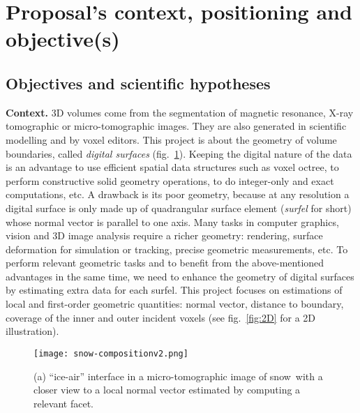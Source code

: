 \section{Proposal's context, positioning and objective(s)}
\label{sec:context}

\subsection{Objectives and scientific hypotheses}


\noindent\textbf{Context.}
3D volumes come from the segmentation of magnetic resonance, X-ray tomographic or micro-tomographic images. 
They are also generated in scientific modelling and by voxel editors. 
This project is about the geometry of volume boundaries, called \emph{digital surfaces} (fig.~\ref{fig:snow}). 
Keeping the digital nature of the data is an advantage
to use efficient spatial data structures such as voxel octree, 
to perform constructive solid geometry operations,
to do integer-only and exact computations, etc.
A drawback is its poor geometry, because at any resolution a digital surface is only 
made up of quadrangular surface element (\emph{surfel} for short) 
whose normal vector is parallel to one axis. 
Many tasks in computer graphics, vision and 3D image analysis require a richer geometry: 
rendering, surface deformation for simulation or tracking, precise geometric measurements, etc.
To perform relevant geometric tasks and 
to benefit from the above-mentioned advantages in the same time, 
we need to enhance the geometry of digital surfaces by estimating extra data for each surfel. 
This project focuses on estimations of local and first-order geometric quantities: 
normal vector, distance to boundary, coverage of the inner and outer incident voxels 
(see fig.~\ref{fig:2D} for a 2D illustration).  

\begin{figure}[hb]
 \texttt{[image: snow-compositionv2.png]} %
 \caption{(a) ``ice-air'' interface in a micro-tomographic image of
   snow\protect\footnotemark~with a closer view to a local normal vector
   estimated by computing a relevant facet.} 
\label{fig:snow} 
\end{figure}

